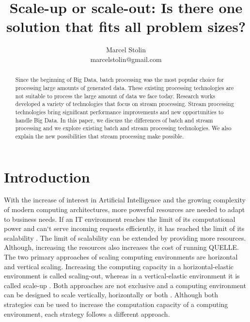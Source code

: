 \documentclass{article}
\title{Scale-up or scale-out: Is there one solution that fits all problem sizes?}
\date{}
\author{Marcel Stolin \\ marcelstolin@gmail.com}
\begin{document}
\maketitle


\begin{abstract}
Since the beginning of Big Data, batch processing was the most popular choice for processing large amounts of generated data. These existing processing technologies are not suitable to process the large amount of data we face today. Research works developed a variety of technologies that focus on stream processing. Stream processing technologies bring significant performance improvements and new opportunities to handle Big Data. In this paper, we discuss the differences of batch and stream processing and we explore existing batch and stream processing technologies. We also explain the new possibilities that stream processing make possible.
\end{abstract}


\section{Introduction} \label{s_intro}
With the increase of interest in Artificial Intelligence and the growing complexity of modern computing architectures, more powerful resources are needed to adapt to business needs. If an IT environment reaches the limit of its computational power and can`t serve incoming requests efficiently, it has reached the limit of its scalability \cite{Wilder2012CloudPatterns}. The limit of scalability can be extended by providing more resources. Although, increasing the resources also increases the cost of running QUELLE.
The two primary approaches of scaling computing environments are horizontal and vertical scaling. Increasing the computing capacity in a horizontal-elastic environment is called scaling-out, whereas in a vertical-elastic environment it is called scale-up \cite{Abbott2015ScalabilityArt}. Both approaches are not exclusive and a computing environment can be designed to scale vertically, horizontally or both \cite{Wilder2012CloudPatterns}.
Although both strategies can be used to increase the computation capacity of a computing environment, each strategy follows a different approach.
\end{document}
